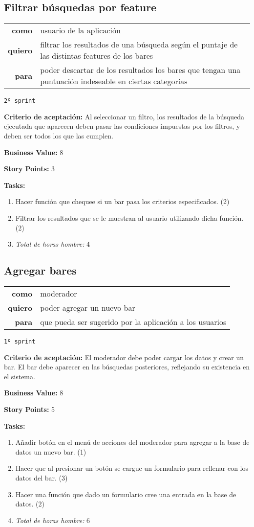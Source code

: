 \documentclass[hidelinks,a4paper,11pt, nofootinbib]{article}
\newcommand{\userstory}[3]{
\begin{tabular}{|r p{10cm}|}
  \hline
  \textbf{como} & #1 \\
  \textbf{quiero} & #2 \\
  \textbf{para} & #3 \\
  \hline
\end{tabular}

}
\newcommand{\critdeacep}[1]{\textbf{Criterio de aceptación:} #1

}
\newcommand{\busvalue}[1]{\textbf{Business Value:} #1

}
\newcommand{\storypoints}[1]{\textbf{Story Points:} #1

}
\newcommand{\primersprint}{\texttt{1º sprint}

}
\newcommand{\segundosprint}{\texttt{2º sprint}

}
\newcommand{\tasks}[1]{\textbf{Tasks:} 

#1}
\begin{document}
\subsection*{Filtrar búsquedas por feature}
\userstory{usuario de la aplicación}{filtrar los resultados de una búsqueda según el puntaje de las distintas features de los bares}{poder descartar de los resultados los bares que tengan una puntuación indeseable en ciertas categorías}
\segundosprint
\critdeacep{Al seleccionar un filtro, los resultados de la búsqueda ejecutada que aparecen deben pasar las condiciones impuestas por los filtros, y deben ser todos los que las cumplen.}
\busvalue{8}
\storypoints{3}
\tasks{
  \begin{enumerate}
    \item Hacer función que chequee si un bar pasa los criterios especificados. (2)
    \item Filtrar los resultados que se le muestran al usuario utilizando dicha función. (2)
    \item[] \textit{Total de horas hombre:} 4
  \end{enumerate}
}

\subsection*{Agregar bares}
\userstory{moderador}{poder agregar un nuevo bar}{que pueda ser sugerido por la aplicación a los usuarios}
\primersprint
\critdeacep{El moderador debe poder cargar los datos y crear un bar. El bar debe aparecer en las búsquedas posteriores, reflejando su existencia en el sistema.}
\busvalue{8}
\storypoints{5}
\tasks{
  \begin{enumerate}
    \item Añadir botón en el menú de acciones del moderador para agregar a la base de datos un nuevo bar. (1)
    \item Hacer que al presionar un botón se cargue un formulario para rellenar con los datos del bar. (3)
    \item Hacer una función que dado un formulario cree una entrada en la base de datos. (2)
    \item[] \textit{Total de horas hombre:} 6
  \end{enumerate}
}
\end{document}
